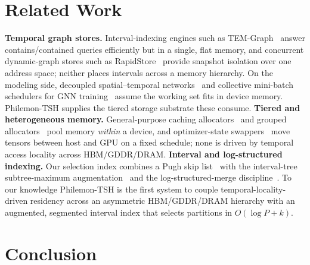 \documentclass[10pt]{article}
\theoremstyle{definition}
\begin{document}
\section{Related Work}
\label{sec:related}

\textbf{Temporal graph stores.} Interval-indexing engines such as
TEM-Graph~\citep{temgraph} answer contains/contained queries efficiently but in a
single, flat memory, and concurrent dynamic-graph stores such as
RapidStore~\citep{rapidstore} provide snapshot isolation over one address space;
neither places intervals across a memory hierarchy. On the modeling side,
decoupled spatial--temporal networks~\citep{d2stgnn} and collective mini-batch
schedulers for GNN training~\citep{morphgl} assume the working set fits in device
memory. Philemon-TSH supplies the tiered storage substrate these consume.
\textbf{Tiered and heterogeneous memory.} General-purpose caching
allocators~\citep{paszke2019pytorch,nccl} and grouped
allocators~\citep{shoeybi2019megatron} pool memory \emph{within} a device, and
optimizer-state swappers~\citep{rasley2020deepspeed} move tensors between host and
GPU on a fixed schedule; none is driven by temporal access locality across
HBM/GDDR/DRAM. \textbf{Interval and log-structured indexing.} Our selection index
combines a Pugh skip list~\citep{pugh1990skiplists} with the interval-tree
subtree-maximum augmentation~\citep[\S14.3]{clrs2009} and the log-structured-merge
discipline~\citep{oneil1996lsm,leveldb}. To our knowledge Philemon-TSH is the first
system to couple temporal-locality-driven residency across an asymmetric
HBM/GDDR/DRAM hierarchy with an augmented, segmented interval index that selects
partitions in $O(\log P + k)$.

\section{Conclusion}
\label{sec:conclusion}
\end{document}
